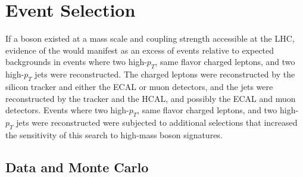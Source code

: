 \chapter{Event Selection}
\label{sec:event_selection_chapter}

If a \WR boson existed at a mass scale and coupling strength accessible at the LHC, evidence 
of the \WR would manifest as an excess of events relative to expected backgrounds in events 
where two high-$p_{T}$, same flavor charged leptons, and two high-$p_{T}$ jets were reconstructed.  The 
charged leptons were reconstructed by the silicon tracker and either the ECAL or muon detectors, 
and the jets were reconstructed by the tracker and the HCAL, and possibly the ECAL and muon 
detectors.  Events where two high-$p_{T}$, same flavor charged leptons, and two high-$p_{T}$ 
jets were reconstructed were subjected to additional selections that increased the sensitivity 
of this search to high-mass \WR boson signatures.


\section{Data and Monte Carlo}

